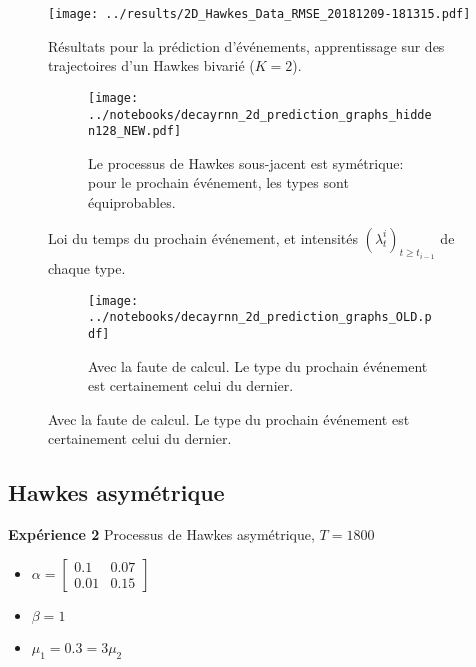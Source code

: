 \documentclass[../main.tex]{subfiles}
\begin{document}
\begin{frame}
\begin{figure}
	\centering
	\texttt{[image: ../results/2D\_Hawkes\_Data\_RMSE\_20181209-181315.pdf]}
	\caption{Résultats pour la prédiction d'événements, apprentissage sur des trajectoires d'un Hawkes bivarié ($K=2$).}
\end{figure}
\end{frame}

\begin{frame}
\begin{figure}
\begin{subfigure}{\linewidth}
	\texttt{[image: ../notebooks/decayrnn\_2d\_prediction\_graphs\_hidden128\_NEW.pdf]}
	\caption{Le processus de Hawkes sous-jacent est symétrique: pour le prochain événement, les types sont équiprobables.}
\end{subfigure}
	\caption{Loi du temps du prochain événement, et intensités $(\lambda^i_t)_{t\geq t_{i-1}}$ de chaque type.}
\end{figure}
\end{frame}

\begin{frame}
\begin{figure}\ContinuedFloat
\begin{subfigure}{\linewidth}
	\texttt{[image: ../notebooks/decayrnn\_2d\_prediction\_graphs\_OLD.pdf]}
	\caption{Avec la faute de calcul. Le type du prochain événement est certainement celui du dernier.}
\end{subfigure}
\end{figure}
\end{frame}

\subsection{Hawkes asymétrique}

\begin{frame}
\textbf{Expérience 2} Processus de Hawkes asymétrique, $T = 1800$
\begin{itemize}
	\item $\alpha = \begin{bmatrix}0.1 & 0.07\\ 0.01 & 0.15\end{bmatrix}$
	\item $\beta = 1$
	\item $\mu_1 = \num{0.3} = 3\mu_2$
\end{itemize}
\end{frame}
\end{document}
